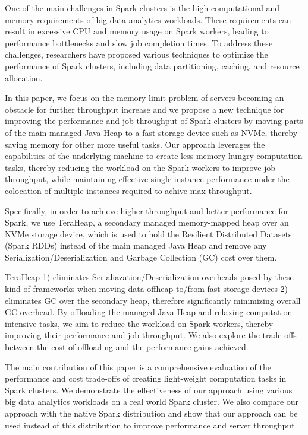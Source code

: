 \documentclass[twocolumn,10pt]{asme2e}
\begin{document}
One of the main challenges in Spark clusters is the high computational and memory requirements of big data analytics workloads. These requirements can result in excessive CPU and memory usage on Spark workers, leading to performance bottlenecks and slow job completion times. To address these challenges, researchers have proposed various techniques to optimize the performance of Spark clusters, including data partitioning, caching, and resource allocation.

In this paper, we focus on the memory limit problem of servers becoming an obstacle for further throughput increase and we propose a new technique for improving the performance and job throughput of Spark clusters by moving parts of the main managed Java Heap to a fast storage device such as NVMe, thereby saving memory for other more useful tasks. Our approach leverages the capabilities of the underlying machine to create less memory-hungry computation tasks, thereby reducing the workload on the Spark workers to improve job throughput, while maintaining effective single instance performance under the colocation of multiple instances required to achive max throughput.

Specifically, in order to achieve higher throughput and better performance for Spark, we use TeraHeap, a secondary managed memory-mapped heap over an NVMe storage device, which is used to hold the Resilient Distributed Datasets (Spark RDDs) instead of the main managed Java Heap and remove any Serialization/Deserialization and Garbage Collection (GC) cost over them.

TeraHeap 1) eliminates Serialiazation/Deserialization overheads posed by these kind of frameworks when moving data offheap to/from fast storage devices 2) eliminates GC over the secondary heap, therefore significantly minimizing overall GC overhead. By offloading the managed Java Heap and relaxing computation-intensive tasks, we aim to reduce the workload on Spark workers, thereby improving their performance and job throughput. We also explore the trade-offs between the cost of offloading and the performance gains achieved.

The main contribution of this paper is a comprehensive evaluation of the performance and cost trade-offs of creating light-weight computation tasks in Spark clusters. We demonstrate the effectiveness of our approach using various big data analytics workloads on a real world Spark cluster. We also compare our approach with the native Spark distribution and show that our approach can be used instead of this distribution to improve performance and server throughput.
\end{document}
